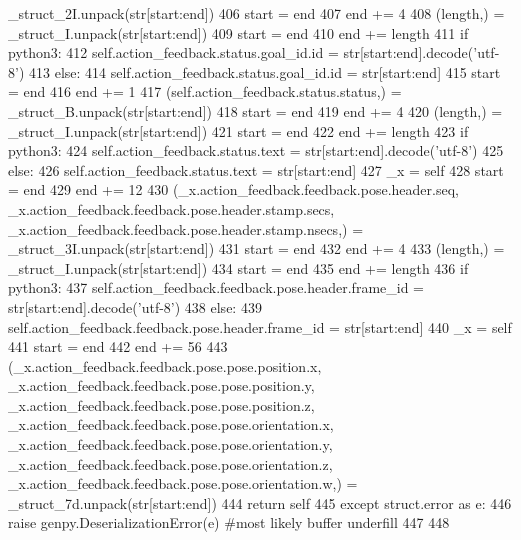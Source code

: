 \begin{DoxyCode}
      \_struct\_2I.unpack(str[start:end])
406       start = end
407       end += 4
408       (length,) = \_struct\_I.unpack(str[start:end])
409       start = end
410       end += length
411       \textcolor{keywordflow}{if} python3:
412         self.action\_feedback.status.goal\_id.id = str[start:end].decode(\textcolor{stringliteral}{'utf-8'})
413       \textcolor{keywordflow}{else}:
414         self.action\_feedback.status.goal\_id.id = str[start:end]
415       start = end
416       end += 1
417       (self.action\_feedback.status.status,) = \_struct\_B.unpack(str[start:end])
418       start = end
419       end += 4
420       (length,) = \_struct\_I.unpack(str[start:end])
421       start = end
422       end += length
423       \textcolor{keywordflow}{if} python3:
424         self.action\_feedback.status.text = str[start:end].decode(\textcolor{stringliteral}{'utf-8'})
425       \textcolor{keywordflow}{else}:
426         self.action\_feedback.status.text = str[start:end]
427       \_x = self
428       start = end
429       end += 12
430       (\_x.action\_feedback.feedback.pose.header.seq, \_x.action\_feedback.feedback.pose.header.stamp.secs, 
      \_x.action\_feedback.feedback.pose.header.stamp.nsecs,) = \_struct\_3I.unpack(str[start:end])
431       start = end
432       end += 4
433       (length,) = \_struct\_I.unpack(str[start:end])
434       start = end
435       end += length
436       \textcolor{keywordflow}{if} python3:
437         self.action\_feedback.feedback.pose.header.frame\_id = str[start:end].decode(\textcolor{stringliteral}{'utf-8'})
438       \textcolor{keywordflow}{else}:
439         self.action\_feedback.feedback.pose.header.frame\_id = str[start:end]
440       \_x = self
441       start = end
442       end += 56
443       (\_x.action\_feedback.feedback.pose.pose.position.x, \_x.action\_feedback.feedback.pose.pose.position.y, 
      \_x.action\_feedback.feedback.pose.pose.position.z, \_x.action\_feedback.feedback.pose.pose.orientation.x, 
      \_x.action\_feedback.feedback.pose.pose.orientation.y, \_x.action\_feedback.feedback.pose.pose.orientation.z, 
      \_x.action\_feedback.feedback.pose.pose.orientation.w,) = \_struct\_7d.unpack(str[start:end])
444       \textcolor{keywordflow}{return} self
445     \textcolor{keywordflow}{except} struct.error \textcolor{keyword}{as} e:
446       \textcolor{keywordflow}{raise} genpy.DeserializationError(e) \textcolor{comment}{#most likely buffer underfill}
447 
448 
\end{DoxyCode}

